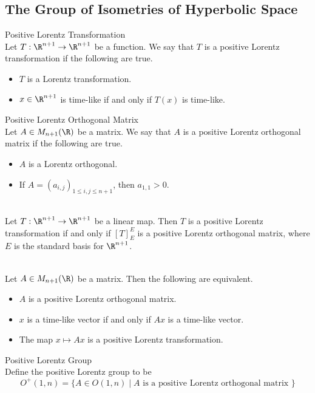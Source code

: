 \documentclass[a4paper]{article}
\begin{document}
\subsection{The Group of Isometries of Hyperbolic Space}
\begin{defn}{Positive Lorentz Transformation}{}\\
Let $T:\R^{n+1}\to\R^{n+1}$ be a function. We say that $T$ is a positive Lorentz transformation if the following are true. 
\begin{itemize}
\item $T$ is a Lorentz transformation. 
\item $x\in\R^{n+1}$ is time-like if and only if $T(x)$ is time-like. 
\end{itemize}
\end{defn}

\begin{defn}{Positive Lorentz Orthogonal Matrix}{}\\
Let $A\in M_{n+1}(\R)$ be a matrix. We say that $A$ is a positive Lorentz orthogonal matrix if the following are true. 
\begin{itemize}
\item $A$ is a Lorentz orthogonal. 
\item If $A=(a_{i,j})_{1\leq i,j\leq n+1}$, then $a_{1,1}>0$. 
\end{itemize}
\end{defn}

\begin{lmm}{}{}\\
Let $T:\R^{n+1}\to\R^{n+1}$ be a linear map. Then $T$ is a positive Lorentz transformation if and only if $[T]_E^E$ is a positive Lorentz orthogonal matrix, where $E$ is the standard basis for $\R^{n+1}$. 
\end{lmm}

\begin{lmm}{}{}\\
Let $A\in M_{n+1}(\R)$ be a matrix. Then the following are equivalent. 
\begin{itemize}
\item $A$ is a positive Lorentz orthogonal matrix. 
\item $x$ is a time-like vector if and only if $Ax$ is a time-like vector. 
\item The map $x\mapsto Ax$ is a positive Lorentz transformation. 
\end{itemize}
\end{lmm}

\begin{defn}{Positive Lorentz Group}{}\\
Define the positive Lorentz group to be $$O^+(1,n)=\{A\in O(1,n)\;|\;A\text{ is a positive Lorentz orthogonal matrix }\}$$
\end{defn}
\end{document}

